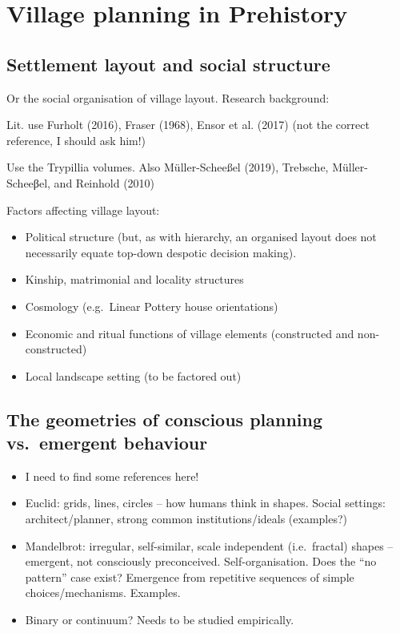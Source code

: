 \documentclass[
  12pt,
]{book}
\begin{document}
\hypertarget{images-theory}{%
\chapter{Village planning in Prehistory}\label{images-theory}}

\hypertarget{settlement-layout-and-social-structure}{%
\section{Settlement layout and social structure}\label{settlement-layout-and-social-structure}}

Or the social organisation of village layout. Research background:

Lit. use Furholt (2016), Fraser (1968), Ensor et al. (2017) (not the correct reference, I should ask him!)

Use the Trypillia volumes. Also Müller-Scheeßel (2019), Trebsche, Müller-Scheeβel, and Reinhold (2010)

Factors affecting village layout:

\begin{itemize}
\item
  Political structure (but, as with hierarchy, an organised layout does not necessarily equate top-down despotic decision making).
\item
  Kinship, matrimonial and locality structures
\item
  Cosmology (e.g.~Linear Pottery house orientations)
\item
  Economic and ritual functions of village elements (constructed and non-constructed)
\item
  Local landscape setting (to be factored out)
\end{itemize}

\hypertarget{the-geometries-of-conscious-planning-vs.-emergent-behaviour}{%
\section{The geometries of conscious planning vs.~emergent behaviour}\label{the-geometries-of-conscious-planning-vs.-emergent-behaviour}}

\begin{itemize}
\item
  I need to find some references here!
\item
  Euclid: grids, lines, circles -- how humans think in shapes. Social settings: architect/planner, strong common institutions/ideals (examples?)
\item
  Mandelbrot: irregular, self-similar, scale independent (i.e.~fractal) shapes -- emergent, not consciously preconceived. Self-organisation. Does the ``no pattern'' case exist? Emergence from repetitive sequences of simple choices/mechanisms. Examples.
\item
  Binary or continuum? Needs to be studied empirically.
\end{itemize}
\end{document}
